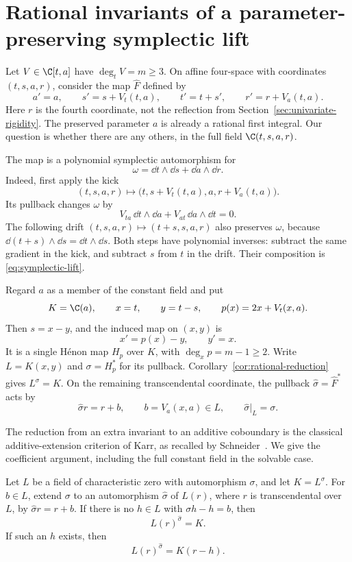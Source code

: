 \section{Rational invariants of a parameter-preserving symplectic lift}
\label{sec:symplectic-lift}

Let $V\in\C[t,a]$ have $\deg_tV=m\ge3$. On affine four-space with
coordinates $(t,s,a,r)$, consider the map $\widehat F$ defined by
\begin{equation}
 a'=a,\qquad s'=s+V_t(t,a),\qquad
 t'=t+s',\qquad r'=r+V_a(t,a).
 \label{eq:symplectic-lift}
\end{equation}
Here $r$ is the fourth coordinate, not the reflection from
Section~\ref{sec:univariate-rigidity}. The preserved parameter $a$ is
already a rational first integral. Our question is whether there are any
others, in the full field $\C(t,s,a,r)$.

The map is a polynomial symplectic automorphism for
\[
 \omega=\dd t\wedge\dd s+\dd a\wedge\dd r.
\]
Indeed, first apply the kick
\[
 (t,s,a,r)\longmapsto
 \bigl(t,s+V_t(t,a),a,r+V_a(t,a)\bigr).
\]
Its pullback changes $\omega$ by
\[
 V_{ta}\,\dd t\wedge\dd a+
 V_{at}\,\dd a\wedge\dd t=0.
\]
The following drift $(t,s,a,r)\mapsto(t+s,s,a,r)$ also preserves $\omega$,
because $\dd(t+s)\wedge\dd s=\dd t\wedge\dd s$. Both steps have polynomial
inverses: subtract the same gradient in the kick, and subtract $s$ from
$t$ in the drift. Their composition is \eqref{eq:symplectic-lift}.

Regard $a$ as a member of the constant field and put
\begin{equation}
 K=\C(a),\qquad x=t,\qquad y=t-s,\qquad
 p(x)=2x+V_t(x,a).
 \label{eq:lift-henon-coordinates}
\end{equation}
Then $s=x-y$, and the induced map on $(x,y)$ is
\[
 x'=p(x)-y,\qquad y'=x.
\]
It is a single H\'enon map $H_p$ over $K$, with
$\deg_xp=m-1\ge2$. Write $L=K(x,y)$ and $\sigma=H_p^*$ for its pullback.
Corollary~\ref{cor:rational-reduction} gives $L^\sigma=K$. On the remaining
transcendental coordinate, the pullback $\widehat\sigma=\widehat F^*$ acts
by
\[
 \widehat\sigma r=r+b,\qquad b=V_a(x,a)\in L,
 \qquad \widehat\sigma|_L=\sigma.
\]

The reduction from an extra invariant to an additive coboundary is the
classical additive-extension criterion of Karr, as recalled by
Schneider~\cite{Schneider2016DifferenceRings}. We give the coefficient
argument, including the full constant field in the solvable case.

\begin{lemma}
\label{lem:additive-extension}
Let $L$ be a field of characteristic zero with automorphism $\sigma$, and
let $K=L^\sigma$. For $b\in L$, extend $\sigma$ to an automorphism
$\widehat\sigma$ of $L(r)$, where $r$ is transcendental over $L$, by
$\widehat\sigma r=r+b$. If there is no $h\in L$ with
$\sigma h-h=b$, then
\[
 L(r)^{\widehat\sigma}=K.
\]
If such an $h$ exists, then
\begin{equation}
 L(r)^{\widehat\sigma}=K(r-h).
 \label{eq:additive-fixed-field}
\end{equation}
\end{lemma}

